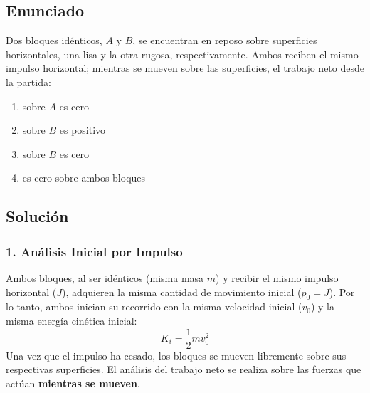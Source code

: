 \documentclass[12pt, a4paper]{article}
\begin{document}
\subsection*{Enunciado}
Dos bloques idénticos, $A$ y $B$, se encuentran en reposo sobre superficies horizontales, una lisa y la otra rugosa, respectivamente. Ambos reciben el mismo impulso horizontal; mientras se mueven sobre las superficies, el trabajo neto desde la partida:
\begin{enumerate}[label=\alph*.]
    \item sobre $A$ es cero
    \item sobre $B$ es positivo
    \item sobre $B$ es cero
    \item es cero sobre ambos bloques
\end{enumerate}

\subsection*{Solución}

\subsubsection*{1. Análisis Inicial por Impulso}
Ambos bloques, al ser idénticos (misma masa $m$) y recibir el mismo impulso horizontal ($J$), adquieren la misma cantidad de movimiento inicial ($p_0 = J$). Por lo tanto, ambos inician su recorrido con la misma velocidad inicial ($v_0$) y la misma energía cinética inicial:
$$K_i = \frac{1}{2}mv_0^2$$
Una vez que el impulso ha cesado, los bloques se mueven libremente sobre sus respectivas superficies. El análisis del trabajo neto se realiza sobre las fuerzas que actúan \textbf{mientras se mueven}.
\end{document}

